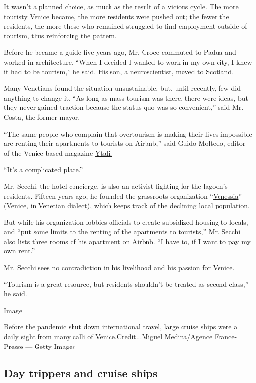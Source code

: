 It wasn't a planned choice, as much as the result of a vicious cycle.
The more touristy Venice became, the more residents were pushed out; the
fewer the residents, the more those who remained struggled to find
employment outside of tourism, thus reinforcing the pattern.

Before he became a guide five years ago, Mr. Croce commuted to Padua and
worked in architecture. ``When I decided I wanted to work in my own
city, I knew it had to be tourism,'' he said. His son, a neuroscientist,
moved to Scotland.

Many Venetians found the situation unsustainable, but, until recently,
few did anything to change it. ``As long as mass tourism was there,
there were ideas, but they never gained traction because the status quo
was so convenient,'' said Mr. Costa, the former mayor.

``The same people who complain that overtourism is making their lives
impossible are renting their apartments to tourists on Airbnb,'' said
Guido Moltedo, editor of the Venice-based magazine
\href{https://ytali.com/}{Ytali.}

``It's a complicated place.''

Mr. Secchi, the hotel concierge, is also an activist fighting for the
lagoon's residents. Fifteen years ago, he founded the grassroots
organization ``\href{http://www.venessia.com/}{Venessia}'' (Venice, in
Venetian dialect), which keeps track of the declining local population.

But while his organization lobbies officials to create subsidized
housing to locals, and ``put some limits to the renting of the
apartments to tourists,'' Mr. Secchi also lists three rooms of his
apartment on Airbnb. ``I have to, if I want to pay my own rent.''

Mr. Secchi sees no contradiction in his livelihood and his passion for
Venice.

``Tourism is a great resource, but residents shouldn't be treated as
second class,'' he said.

Image

Before the pandemic shut down international travel, large cruise ships
were a daily sight from many calli of Venice.Credit...Miguel
Medina/Agence France-Presse --- Getty Images

\hypertarget{day-trippers-and-cruise-ships}{%
\subsection{Day trippers and cruise
ships}\label{day-trippers-and-cruise-ships}}

